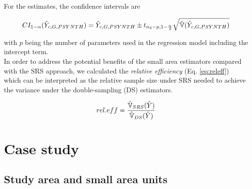 For the \psynth{} estimates, the confidence intervals are


\begin{equation}\label{ci_2phase_psynth}
CI_{1-\alpha}(\hat{Y}_{c,G,PSYNTH})=\hat{Y}_{c,G,PSYNTH} \pm t_{n_{2}-p, 1-\frac{\alpha}{2}}\sqrt{\hat{\mathbb{V}}(\hat{Y}_{c,G,PSYNTH})}
\end{equation}

\noindent with $p$ being the number of parameters used in the regression model including the intercept term.\\

In order to address the potential benefits of the small area estimators compared with the SRS approach, we calculated the \textit{relative efficiency} (Eq. \ref{eq:releff}) which can be interpreted as the relative sample size under SRS needed to achieve the variance under the double-sampling (DS) estimators.

\begin{equation}\label{eq:releff}
rel.eff=\frac{\hat{\mathbb{V}}_{SRS}(\hat{Y})}{\hat{\mathbb{V}}_{DS}(\hat{Y})}
\end{equation}

\newpage



\section{Case study}
\label{sec:CaseStudy}


\subsection{Study area and small area units}
\label{sec:studyarea}

